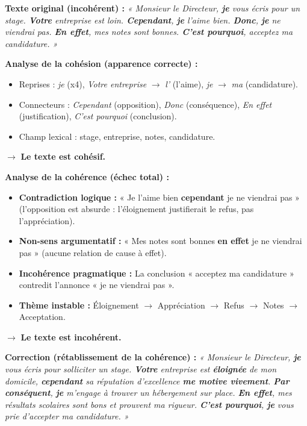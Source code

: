 \documentclass[11pt]{article}
\begin{document}
\begin{exemplebox}
\textbf{Texte original (incohérent) :}
\emph{« Monsieur le Directeur, \textbf{je} vous écris pour un stage. \textbf{Votre} entreprise est loin. \textbf{Cependant}, \textbf{je} l'aime bien. \textbf{Donc}, \textbf{je} ne viendrai pas. \textbf{En effet}, mes notes sont bonnes. \textbf{C'est pourquoi}, acceptez ma candidature. »}

\textbf{Analyse de la cohésion (apparence correcte) :}
\begin{itemize}
    \item Reprises : \emph{je} (x4), \emph{Votre entreprise} $\rightarrow$ \emph{l'} (l'aime), \emph{je} $\rightarrow$ \emph{ma} (candidature).
    \item Connecteurs : \emph{Cependant} (opposition), \emph{Donc} (conséquence), \emph{En effet} (justification), \emph{C'est pourquoi} (conclusion).
    \item Champ lexical : stage, entreprise, notes, candidature.
\end{itemize}
$\rightarrow$ \textbf{Le texte est cohésif.}

\textbf{Analyse de la cohérence (échec total) :}
\begin{itemize}
    \item \textbf{Contradiction logique :} « Je l'aime bien \textbf{cependant} je ne viendrai pas » (l'opposition est absurde : l'éloignement justifierait le refus, pas l'appréciation).
    \item \textbf{Non-sens argumentatif :} « Mes notes sont bonnes \textbf{en effet} je ne viendrai pas » (aucune relation de cause à effet).
    \item \textbf{Incohérence pragmatique :} La conclusion « acceptez ma candidature » contredit l'annonce « je ne viendrai pas ».
    \item \textbf{Thème instable :} Éloignement $\rightarrow$ Appréciation $\rightarrow$ Refus $\rightarrow$ Notes $\rightarrow$ Acceptation.
\end{itemize}
$\rightarrow$ \textbf{Le texte est incohérent.}

\textbf{Correction (rétablissement de la cohérence) :}
\emph{« Monsieur le Directeur, \textbf{je} vous écris pour solliciter un stage. \textbf{Votre} entreprise est \textbf{éloignée} de mon domicile, \textbf{cependant} sa réputation d'excellence \textbf{me motive vivement}. \textbf{Par conséquent}, \textbf{je} m'engage à trouver un hébergement sur place. \textbf{En effet}, mes résultats scolaires sont bons et prouvent ma rigueur. \textbf{C'est pourquoi}, \textbf{je} vous prie d'accepter ma candidature. »}


\end{exemplebox}
\end{document}
